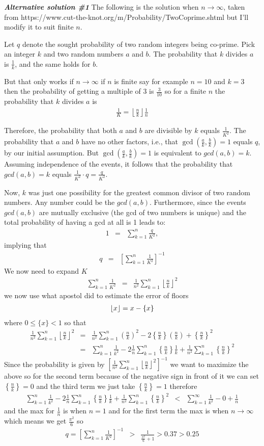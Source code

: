\documentclass[aps,preprint,preprintnumbers,nofootinbib,showpacs,prd]{revtex4-1}
\newcommand{\nbea}{\begin{eqnarray*}}
\newcommand{\neea}{\end{eqnarray*}}
\DeclarePairedDelimiter{\floor}{\lfloor}{\rfloor}
\begin{document}
\bigskip
\textbf{\textit{Alternative solution \#1}}
\bigskip
The following is the solution when $n\to\infty$, taken from https://www.cut-the-knot.org/m/Probability/TwoCoprime.shtml but I'll modify it to suit finite $n$.

Let $q$ denote the sought probability of two random integers being co-prime. Pick an integer $k$ and two random numbers $a$ and $b$. The probability that $k$ divides $a$ is $\frac{1}{k}$, and the same holds for $b$. 

But that only works if $n \to \infty$ if $n$ is finite say for example $n = 10$ and $k = 3$ then the probability of getting a multiple of 3 is $\frac{3}{10}$ so for a finite $n$ the probability that $k$ divides $a$ is
%
\nbea
\frac{1}{K} = \left \lfloor \frac{n}{k}\right \rfloor \frac{1}{n}
\neea
%

Therefore, the probability that both $a$ and $b$ are divisible by $k$ equals $\frac{1}{K^2}$. The probability that $a$ and $b$ have no other factors, i.e., that $\gcd\left (\frac{a}{k},\frac{b}{k} \right )=1$ equals $q$, by our initial assumption. But $\gcd\left (\frac{a}{k},\frac{b}{k} \right )=1$ is equivalent to $gcd(a,b)=k$. Assuming independence of the events, it follows that the probability that $gcd(a,b)=k$ equals $\frac{1}{K^2}\cdot q= \frac{q}{K^2}$.

Now, $k$ was just one possibility for the greatest common divisor of two random numbers. Any number could be the $gcd(a,b)$. Furthermore, since the events $gcd(a,b)$ are mutually exclusive (the gcd of two numbers is unique) and the total probability of having a gcd at all is 1 leads to:
%
\nbea
1 & = & \sum_{k=1}^n \frac{q}{K^2},
\neea
%
implying that
%
\nbea
q & = & \left [ \sum_{k=1}^n \frac{1}{K^2} \right ]^{-1}
\neea
%
We now need to expand $K$
%
\nbea
\sum_{k=1}^n \frac{1}{K^2} & = & \frac{1}{n^2} \sum_{k=1}^n \left \lfloor \frac{n}{k}\right \rfloor^2
\neea
%
we now use what apostol did to estimate the error of floors 
%
\nbea
\floor{x} = x - \{ x \}
\neea
%
where $0 \le \{ x \} < 1$ so that
%
\nbea
\frac{1}{n^2} \sum_{k=1}^n \left \lfloor \frac{n}{k}\right \rfloor^2 & = & \frac{1}{n^2} \sum_{k=1}^n \left ( \frac{n}{k}\right )^2 - 2 \left \{ \frac{n}{k}\right \}\left ( \frac{n}{k}\right ) + \left \{ \frac{n}{k}\right \}^2 \\
& = & \sum_{k=1}^n \frac{1}{k^2} - 2\frac{1}{n} \sum_{k=1}^n \left \{ \frac{n}{k}\right \} \frac{1}{k} + \frac{1}{n^2}\sum_{k=1}^n\left \{ \frac{n}{k}\right \}^2
\neea
%
Since the probability is given by $\left [ \frac{1}{n^2} \sum_{k=1}^n \left \lfloor \frac{n}{k}\right \rfloor^2 \right ]^{-1}$ we want to maximize the above so for the second term because of the negative sign in front of it we can set $\left \{ \frac{n}{k}\right \} = 0$ and the third term we just take $\left \{ \frac{n}{k}\right \} = 1$ therefore 
%
\nbea
\sum_{k=1}^n \frac{1}{k^2} - 2\frac{1}{n} \sum_{k=1}^n \left \{ \frac{n}{k}\right \} \frac{1}{k} + \frac{1}{n^2}\sum_{k=1}^n\left \{ \frac{n}{k}\right \}^2 & < & \sum_{k=1}^\infty \frac{1}{k^2} - 0 + \frac{1}{n}
\neea
%
and the max for $\frac{1}{n}$ is when $n = 1$ and for the first term the max is when $n \to \infty$ which means we get $\frac{\pi^2}{6}$ so 
%
\nbea
q = \left [ \sum_{k=1}^n \frac{1}{K^2} \right ]^{-1} & > & \frac{1}{\frac{\pi^2}{6} + 1} > 0.37 > 0.25
\neea
%
\end{document}
